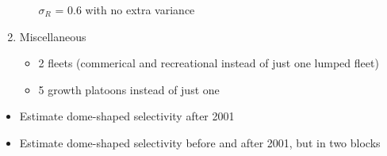 \documentclass[11pt,
  english,
  a4paper,
]{article}
\begin{document}
\begin{enumerate}
\begin{itemize}
    {\(\sigma_R\)\leavevmode\tagmcend\tagstructend} = 0.6 with no extra variance

    \tagmcend\tagstructend\tagstructend

    \tagmcend\tagstructend\tagstructend
  \end{itemize}

  \tagstructend
\item

  Miscellaneous

  \tagmcend\tagstructend\tagstructend


  \begin{itemize}
  \item


    2 fleets (commerical and recreational instead of just one lumped fleet)

    \tagmcend\tagstructend\tagstructend

    \tagmcend\tagstructend\tagstructend
  \item


    5 growth platoons instead of just one

    \tagmcend\tagstructend\tagstructend

    \tagmcend\tagstructend\tagstructend
  \end{itemize}

  \tagstructend
\end{enumerate}

\tagstructend


\begin{itemize}
\item

  Estimate dome-shaped selectivity after 2001

  \tagmcend\tagstructend\tagstructend
\item

  Estimate dome-shaped selectivity before and after 2001, but in two blocks

  \tagmcend\tagstructend\tagstructend
\end{itemize}
\end{document}
